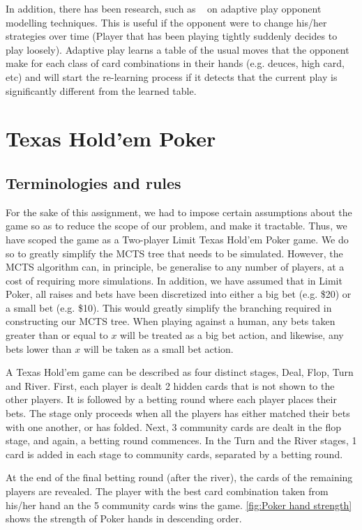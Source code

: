\documentclass[11pt, a4paper, oneside]{article}
\begin{document}
In addition, there has been research, such as ~\cite{Maitrepierre} on adaptive play opponent modelling techniques. This is useful if the opponent were to change his/her strategies over time (Player that has been playing tightly suddenly decides to play loosely). Adaptive play learns a table of the usual moves that the opponent make for each class of card combinations in their hands (e.g. deuces, high card, etc) and will start the re-learning process if it detects that the current play is significantly different from the learned table.

\section{Texas Hold'em Poker}
\subsection{Terminologies and rules}
For the sake of this assignment, we had to impose certain assumptions about the game so as to reduce the scope of our problem, and make it tractable. Thus, we have scoped the game as a Two-player Limit Texas Hold'em Poker game. We do so to greatly simplify the MCTS tree that needs to be simulated. However, the MCTS algorithm can, in principle, be generalise to any number of players, at a cost of requiring more simulations. In addition, we have assumed that in Limit Poker, all raises and bets have been discretized into either a big bet (e.g. \$20) or a small bet (e.g. \$10). This would greatly simplify the branching required in constructing our MCTS tree. When playing against a human, any bets taken greater than or equal to $x$ will be treated as a big bet action, and likewise, any bets lower than $x$ will be taken as a small bet action.

A Texas Hold'em game can be described as four distinct stages, Deal, Flop, Turn and River. 
First, each player is dealt 2 hidden cards that is not shown to the other players. It is followed by a betting round where each player places their bets. The stage only proceeds when all the players has either matched their bets with one another, or has folded. 
Next, 3 community cards are dealt in the flop stage, and again, a betting round commences. In the Turn and the River stages, 1 card is added in each stage to community cards, separated by a betting round.

At the end of the final betting round (after the river), the cards of the remaining players are revealed. The player with the best card combination taken from his/her hand an the 5 community cards wins the game. \autoref{fig:Poker hand strength} shows the strength of Poker hands in descending order.
\end{document}
